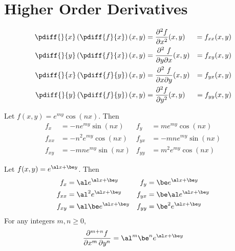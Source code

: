 \section{Higher Order Derivatives}\label{sec higher order}
\begin{alignat*}{5}
\pdiff{}{x}\left(\pdiff{f}{x}\right)(x,y)
&=\frac{\partial^2 f}{\partial x^2}(x,y) &= f_{xx}(x,y) \\
\pdiff{}{y}\left(\pdiff{f}{x}\right)(x,y)
&=\frac{\partial^2\ f}{\partial y\partial x}(x,y) &= f_{xy}(x,y) \\
\pdiff{}{x}\left(\pdiff{f}{y}\right)(x,y)
&=\frac{\partial^2\ f}{\partial x\partial y}(x,y) &= f_{yx}(x,y) \\
\pdiff{}{y}\left(\pdiff{f}{y}\right)(x,y)
&=\frac{\partial^2 f}{\partial y^2}(x,y) &= f_{yy}(x,y)
\end{alignat*}
\begin{eg}\label{eg higher order A}
Let $f(x,y) = e^{my}\cos(nx)$. Then
\begin{align*}
f_x &=  -n e^{my}\sin(nx) &
f_y &=   m e^{my}\cos(nx) \\
f_{xx}  &=   -n^2 e^{my}\cos(nx) &
f_{yx} &=   -m n e^{my}\sin(nx) \\
f_{xy}  &=   -m n e^{my}\sin(nx) &
f_{yy} &=   m^2 e^{my}\cos(nx)
\end{align*}
\end{eg}
\begin{eg}\label{eg higher order B}
Let $f(x,y) = e^{\al x+\be y}$. Then
\begin{align*}
f_x &=  \al e^{\al x+\be y} &
f_y &=  \be e^{\al x+\be y} \\
f_{xx}  &= \al^2  e^{\al x+\be y} &
f_{yx} &=   \be \al e^{\al x+\be y} \\
f_{xy}  &=  \al \be  e^{\al x+\be y} &
f_{yy} &=  \be^2 e^{\al x+\be y}
\end{align*}
For any integers $m,n\geqslant 0$,
\begin{equation*}
\frac{\partial^{m+n} f}{\partial x^m\, \partial y^n}
= \al^m\be^n e^{\al x+\be y}
\end{equation*}
\end{eg}
